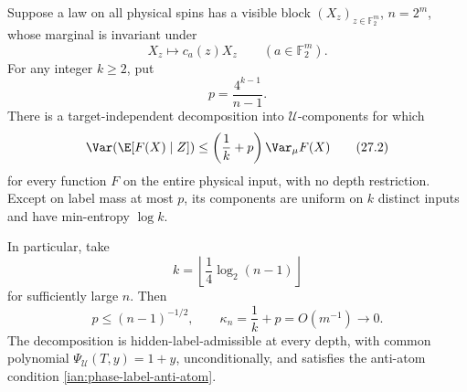 \begin{lemma}
\label{ian:hidden-label-sample-decomposition}
Suppose a law on all physical spins has a visible block
\((X_z)_{z\in\mathbb F_2^m}\), \(n=2^m\), whose marginal is invariant under
\[
 X_z\longmapsto c_a(z)X_z
 \qquad(a\in\mathbb F_2^m).
\]
For any integer \(k\ge2\), put
\[
 p=\frac{4^{k-1}}{n-1}.
\]
There is a target-independent decomposition into
\(\mathcal U\)-components for which
\[
 \Var(\E[F(X)\mid Z])
 \le\left(\frac1k+p\right)\Var_\mu F(X)
 \tag{27.2}\label{ian:hidden-label-sample-contraction}
\]
for every function \(F\) on the entire physical input, with no depth restriction. Except on label mass at most \(p\), its components are uniform on \(k\) distinct inputs and have min-entropy \(\log k\).

In particular, take
\[
 k=\left\lfloor\frac14\log_2(n-1)\right\rfloor
\]
for sufficiently large \(n\). Then
\[
 p\le(n-1)^{-1/2},\qquad
 \kappa_n=\frac1k+p=O(m^{-1})\longrightarrow0.
\]
The decomposition is hidden-label-admissible at every depth, with common polynomial
\(\Psi_{\mathcal U}(T,y)=1+y\), unconditionally, and satisfies the anti-atom condition \eqref{ian:phase-label-anti-atom}.
\end{lemma}

